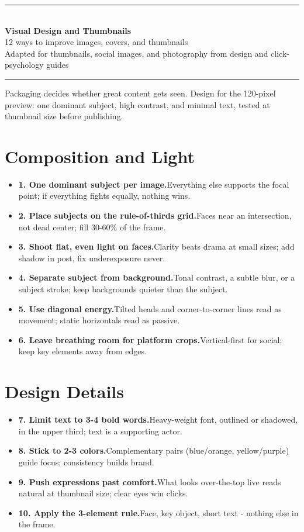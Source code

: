 \documentclass[11pt]{article}
\newcommand{\tip}[2]{\item \textbf{#1.}\enspace #2}
\newcommand{\tlabel}{\textcolor{accent}{\small$\blacktriangleright$}}
\newcommand{\footertitle}{Content Creation Playbook}
\newcommand{\docbanner}[3]{%
  \begin{center}
    {\color{accent}\rule{\textwidth}{1.4pt}}\\[10pt]
    {\Huge\bfseries\color{black} #1}\\[8pt]
    {\large\color{softgray} #2}\\[8pt]
    {\small\color{softgray} #3}\\[6pt]
    {\color{accent}\rule{\textwidth}{1.4pt}}
  \end{center}
  \vspace{6pt}
}
\begin{document}
\renewcommand{\footertitle}{Visual Design and Thumbnails}
\docbanner{Visual Design and Thumbnails}{12 ways to improve images, covers, and thumbnails}{Adapted for thumbnails, social images, and photography from design and click-psychology guides}
\begin{tcolorbox}[colback=accent!5,colframe=accent,boxrule=0.8pt,arc=2pt,left=8pt,right=8pt,top=6pt,bottom=6pt]
\small Packaging decides whether great content gets seen. Design for the 120-pixel preview: one dominant subject, high contrast, and minimal text, tested at thumbnail size before publishing.
\end{tcolorbox}
\vspace{6pt}
\section*{Composition and Light}
\begin{itemize}[label=\tlabel]
\tip{1. One dominant subject per image}{Everything else supports the focal point; if everything fights equally, nothing wins.}
\tip{2. Place subjects on the rule-of-thirds grid}{Faces near an intersection, not dead center; fill 30-60\% of the frame.}
\tip{3. Shoot flat, even light on faces}{Clarity beats drama at small sizes; add shadow in post, fix underexposure never.}
\tip{4. Separate subject from background}{Tonal contrast, a subtle blur, or a subject stroke; keep backgrounds quieter than the subject.}
\tip{5. Use diagonal energy}{Tilted heads and corner-to-corner lines read as movement; static horizontals read as passive.}
\tip{6. Leave breathing room for platform crops}{Vertical-first for social; keep key elements away from edges.}
\end{itemize}
\section*{Design Details}
\begin{itemize}[label=\tlabel]
\tip{7. Limit text to 3-4 bold words}{Heavy-weight font, outlined or shadowed, in the upper third; text is a supporting actor.}
\tip{8. Stick to 2-3 colors}{Complementary pairs (blue/orange, yellow/purple) guide focus; consistency builds brand.}
\tip{9. Push expressions past comfort}{What looks over-the-top live reads natural at thumbnail size; clear eyes win clicks.}
\tip{10. Apply the 3-element rule}{Face, key object, short text - nothing else in the frame.}
\end{itemize}
\end{document}
